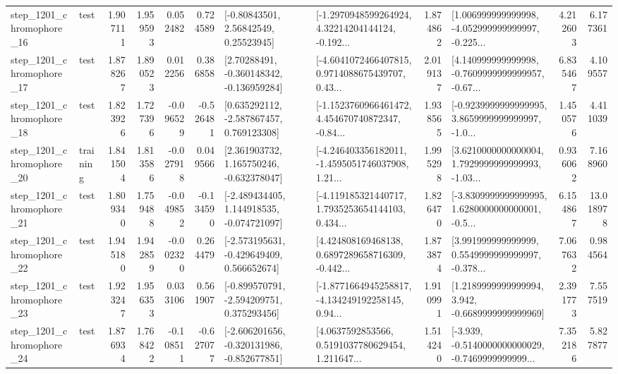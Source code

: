 \begin{tabular}{llrrrrllrlrr}
 step\_1201\_chromophore\_16 &      test &      1.907111 &    1.959593 &      0.052482 &  0.724589 &       [-0.80843501, 2.56842549, 0.25523945] &  [-1.2970948599264924, 4.32214204144124, -0.192... &       1.874862 &  [1.006999999999998, -4.052999999999997, -0.225... &            4.212603 &          6.177361 \\
 step\_1201\_chromophore\_17 &      test &      1.878267 &    1.890523 &      0.012256 &  0.386858 &    [2.70288491, -0.360148342, -0.136959284] &  [-4.6041072466407815, 0.9714088675439707, 0.43... &       2.019137 &  [4.140999999999998, -0.7609999999999957, -0.67... &            6.835467 &          4.109557 \\
 step\_1201\_chromophore\_18 &      test &      1.823926 &    1.727396 &     -0.096529 & -0.526481 &    [0.635292112, -2.587867457, 0.769123308] &  [-1.1523760966461472, 4.454670740872347, -0.84... &       1.938565 &  [-0.9239999999999995, 3.8659999999999997, -1.0... &            1.450576 &          4.411039 \\
 step\_1201\_chromophore\_20 &  training &      1.841504 &    1.813586 &     -0.027918 &  0.049566 &    [2.361903732, 1.165750246, -0.632378047] &  [-4.246403356182011, -1.4595051746037908, 1.21... &       1.995298 &  [3.6210000000000004, 1.7929999999999993, -1.03... &            0.936062 &          7.168960 \\
 step\_1201\_chromophore\_21 &      test &      1.809340 &    1.759488 &     -0.049852 & -0.134590 &   [-2.489434405, 1.144918535, -0.074721097] &  [-4.119185321440717, 1.7935253654144103, 0.434... &       1.826470 &  [-3.8309999999999995, 1.6280000000000001, -0.5... &            6.154867 &         13.018978 \\
 step\_1201\_chromophore\_22 &      test &      1.945180 &    1.942859 &     -0.002320 &  0.264479 &   [-2.573195631, -0.429649409, 0.566652674] &  [4.424808169468138, 0.6897289658716309, -0.442... &       1.873874 &  [3.991999999999999, 0.5549999999999997, -0.378... &            7.067632 &          0.984564 \\
 step\_1201\_chromophore\_23 &      test &      1.923247 &    1.956353 &      0.033106 &  0.561907 &   [-0.899570791, -2.594209751, 0.375293456] &  [-1.8771664945258817, -4.134249192258145, 0.94... &       1.910991 &   [1.2189999999999994, 3.942, -0.6689999999999969] &            2.391773 &          7.557519 \\
 step\_1201\_chromophore\_24 &      test &      1.876934 &    1.768422 &     -0.108511 & -0.627077 &  [-2.606201656, -0.320131986, -0.852677851] &  [4.0637592853566, 0.5191037780629454, 1.211647... &       1.514240 &  [-3.939, -0.5140000000000029, -0.7469999999999... &            7.352186 &          5.827877 \\

\end{tabular}
